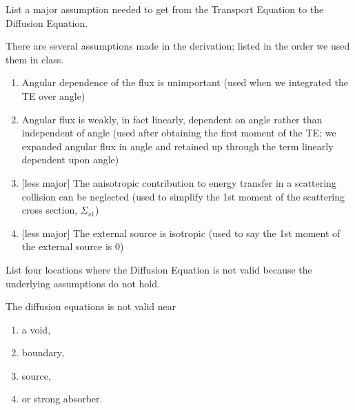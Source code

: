 \documentclass[12pt, answers]{exam}
\newcommand{\Macro}{\ensuremath{\Sigma}}
\begin{document}
\begin{questions}
\begin{solution}
\end{solution}

\vspace*{2em}
\addpoints
\question[10] List a major assumption needed to get from the Transport Equation to the Diffusion Equation.

\begin{solution}
There are several assumptions made in the derivation; listed in the order we used them in class.
%
\begin{enumerate}
\item Angular dependence of the flux is unimportant (used when we integrated the TE over angle)

\item Angular flux is weakly, in fact linearly, dependent on angle rather than independent of angle (used after obtaining the first moment of the TE; we expanded angular flux in angle and retained up through the term linearly dependent upon angle)

\item $[$less major$]$ The anisotropic contribution to energy transfer in a scattering collision can be neglected (used to simplify the 1st moment of the scattering cross section, $\Macro_{s1}$)

\item $[$less major$]$ The external source is isotropic (used to say the 1st moment of the external source is 0)

\end{enumerate}
%
\end{solution}


\vspace*{2em}
\addpoints
\question[10] List four locations where the Diffusion Equation is not valid because the underlying assumptions do not hold.

\begin{solution}
The diffusion equations is not valid near
%
\begin{enumerate}
\item a void, 
\item boundary, 
\item source, 
\item or strong absorber.
\end{enumerate} 
%
\end{solution}

\end{questions}
\end{document}
